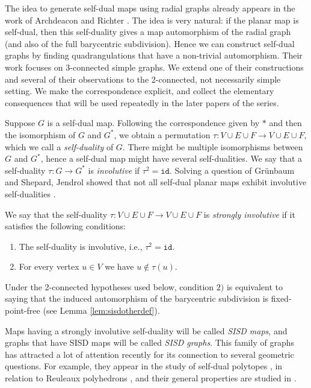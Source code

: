 \documentclass{article}
\newcommand{\id}{\mathtt{id}}
\begin{document}
    The idea to generate self-dual maps using radial graphs already appears in the work of Archdeacon and Richter \cite{archdeacon1992construction}. The idea is very natural: if the planar map is self-dual, then this self-duality gives a map automorphism of the radial graph (and also of the full barycentric subdivision). Hence we can construct self-dual graphs by finding quadrangulations that have a non-trivial automorphism. Their work focuses on 3-connected simple graphs. We extend one of their constructions and several of their observations to the 2-connected, not necessarily simple setting.  We make the correspondence explicit, and collect the elementary consequences that will be used repeatedly in the later papers of the series. 


Suppose $G$ is a self-dual map. Following the correspondence given by $*$ and then the isomorphism of $G$ and $G^*$, we obtain a permutation $\tau:V\cup E\cup F\rightarrow V\cup E \cup F$, which we call a \emph{self-duality} of $G$. There might be multiple isomorphisms between $G$ and $G^*$, hence a self-dual map might have several self-dualities. We say that a self-duality  $\tau:G\rightarrow G^*$ is \emph{involutive} if $\tau^2=\id$. Solving a question of Grünbaum and Shepard, Jendrol showed that not all self-dual planar maps exhibit involutive self-dualities \cite{grunbaum1988,jendrol1989}.



We say that the self-duality  $\tau:V\cup E\cup F\rightarrow V\cup E \cup F$ is \emph{strongly involutive} if it satisfies the following conditions:
\begin{enumerate}
    \item[1)]  The self-duality is involutive, i.e., $\tau^2=\id$.
    \item[2)]  For every vertex $u\in V$ we have $u \notin \tau (u)$.
\end{enumerate}

Under the 2-connected hypotheses used below, condition $2)$ is equivalent to saying that the induced automorphism of the barycentric subdivision is fixed-point-free (see Lemma \ref{lem:sisdotherdef}).



Maps having a strongly involutive self-duality will be called \emph{SISD maps}, and graphs that have SISD maps will be called \emph{SISD graphs}. This family of graphs has attracted a lot of attention recently for its connection to several geometric questions. For example, they appear in the study of self-dual polytopes \cite{lovasz1983self,gouveia2023self,horvath2021strongly,horvath2025strongly}, in relation to Reuleaux polyhedrons \cite{montejano2020graphs,lopez2023borsuk}, and their general properties are studied in \cite{montejano2022self,bracho2020strongly,bracho202410}.
\end{document}
